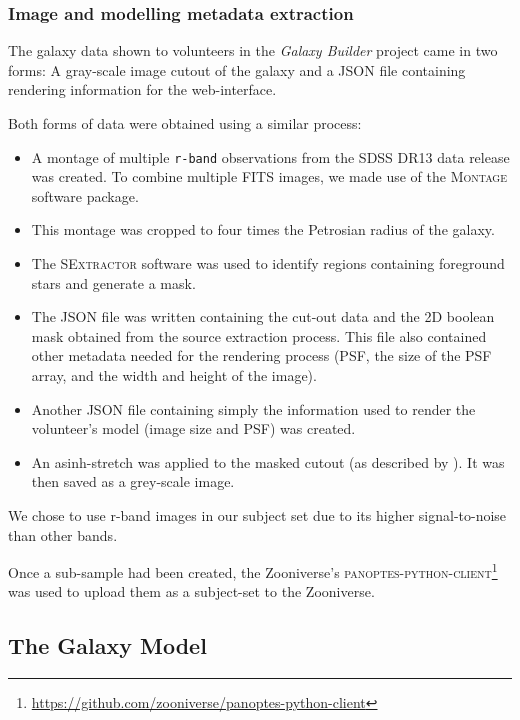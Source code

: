 \documentclass[../main.tex]{subfiles}
\begin{document}
\subsubsection{Image and modelling metadata extraction}

The galaxy data shown to volunteers in the \textit{Galaxy Builder} project came in two forms: A gray-scale image cutout of the galaxy and a JSON file containing rendering information for the web-interface.

Both forms of data were obtained using a similar process:

\begin{itemize}
\item A montage of multiple \texttt{r-band} observations from the SDSS DR13 \citep{2017ApJS..233...25A} data release was created. To combine multiple FITS images, we made use of the \textsc{Montage} \citep{2010arXiv1005.4454J} software package.
\item This montage was cropped to four times the Petrosian radius of the galaxy.
\item The \textsc{SExtractor} software \citep{source-extractor} was used to identify regions containing foreground stars and generate a mask.
\item The JSON file was written containing the cut-out data and the 2D boolean mask obtained from the source extraction process. This file also contained other metadata needed for the rendering process (PSF, the size of the PSF array, and the width and height of the image).
\item Another JSON file containing simply the information used to render the volunteer's model (image size and PSF) was created.
\item An asinh-stretch was applied to the masked cutout (as described by \citealt{Lupton2003:astro-ph/0312483v1}). It was then saved as a grey-scale image.
\end{itemize}

We chose to use r-band images in our subject set due to its higher signal-to-noise than other bands.

Once a sub-sample had been created, the Zooniverse's \textsc{panoptes-python-client}\footnote{\url{https://github.com/zooniverse/panoptes-python-client}} was used to upload them as a subject-set to the Zooniverse.


\subsection{The Galaxy Model}
\label{section:galaxy-model}
\end{document}
